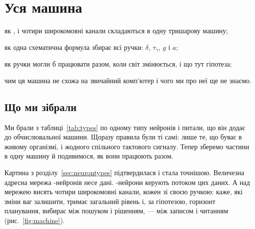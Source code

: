 \chapter{Уся машина}
\label{sec:synthesis}
\begin{chaptergoals}
\item як ,  і чотири широкомовні канали складаються в одну тришарову машину;
\item як одна схематична формула збирає всі ручки: $\delta$, $\tau_\gamma$, $g$ і $a$;
\item як ручки могли б працювати разом, коли світ змінюється, і що тут гіпотеза;
\item чим ця машина не схожа на звичайний комп'ютер і чого ми про неї ще не знаємо.
\end{chaptergoals}

\section{Що ми зібрали}

Ми брали з таблиці~\ref{tab:types} по одному типу нейронів і питали, що він додає до обчислювальної машини. Щоразу правила були ті самі: лише те, що буває в живому організмі, і жодного спільного тактового сигналу. Тепер зберемо частини в одну машину й подивимося, як вони працюють разом.

Картина з розділу~\ref{sec:neurontypes} підтвердилася і стала точнішою. Величезна адресна мережа -нейронів несе дані. -нейрони керують потоком цих даних. А над мережею висять чотири широкомовні канали, кожен зі своєю ручкою:  каже, які зміни ваг залишити,  тримає загальний рівень і, за гіпотезою, горизонт планування,  вибирає між пошуком і рішенням,  --- між записом і читанням (рис.~\ref{fig:machine}).

